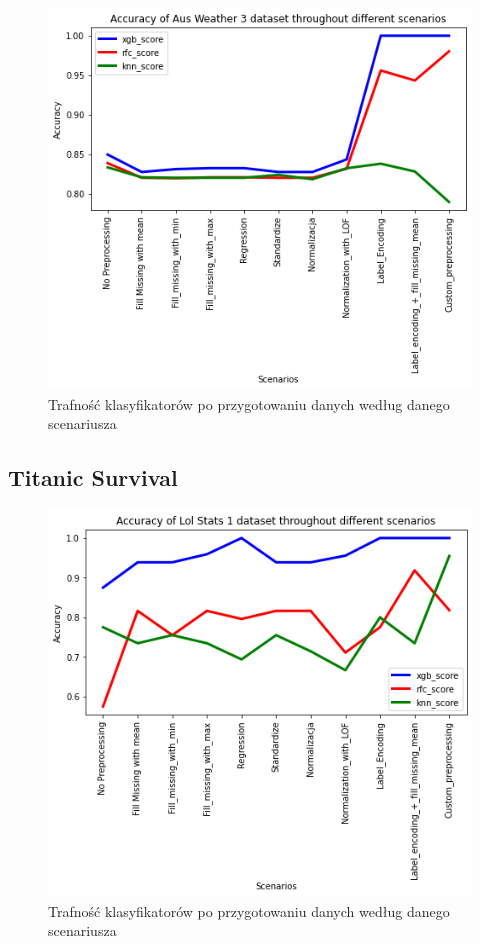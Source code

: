 \documentclass{book}
\begin{document}
\begin{figure}[H]
\centerline{\includegraphics{Aus_Weather_3}}
\centering
\caption{Trafność klasyfikatorów po przygotowaniu danych 
według danego scenariusza}
\end{figure}


\subsection{Titanic Survival}

\begin{figure}[H]
\centerline{\includegraphics{Lol_Stats_1}}
\centering
\caption{Trafność klasyfikatorów po przygotowaniu danych 
według danego scenariusza}
\end{figure}
        
\end{document}
